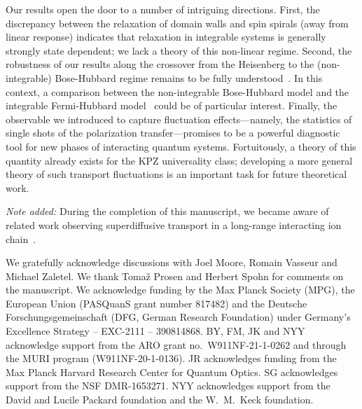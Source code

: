 \documentclass[
 reprint,
 superscriptaddress,
 amsmath,amssymb,
 aps,
 pra,
]{revtex4-2}
\begin{document}
Our results open the door to a number of intriguing directions.
%
First, the discrepancy between the relaxation of domain walls and spin spirals (away from linear response) indicates that relaxation in integrable systems is generally strongly state dependent;
we lack a theory of this non-linear regime.
%
Second, the robustness of our results along the crossover from the Heisenberg to the (non-integrable) Bose-Hubbard regime remains to be fully understood~\cite{DeNardis2021}.
%
In this context, a comparison between the non-integrable Bose-Hubbard model and the integrable Fermi-Hubbard model~\cite{Fava2020} could be of particular interest.
%
Finally, the observable we introduced to capture fluctuation effects---namely, the statistics of single shots of the polarization transfer---promises to be a powerful diagnostic tool for new phases of interacting quantum systems.
%
Fortuitously, a theory of this quantity already exists for the KPZ universality class;
developing a more general theory of such transport fluctuations is an important task for future theoretical work.

\textit{Note added:} During the completion of this manuscript, we became aware of related work observing superdiffusive transport in a long-range interacting ion chain~\cite{IonPaper}.




\begin{acknowledgments}
    

    We gratefully acknowledge discussions with Joel Moore, Romain Vasseur and Michael Zaletel.
    We thank Toma{\v z} Prosen and Herbert Spohn for comments on the manuscript.
    We acknowledge funding by the Max Planck Society (MPG), the European Union (PASQuanS grant number 817482) and the Deutsche Forschungsgemeinschaft (DFG, German Research Foundation) under Germany’s Excellence Strategy – EXC-2111 – 390814868.
    BY, FM, JK and NYY acknowledge support from the ARO grant no.~W911NF-21-1-0262 and through the MURI program (W911NF-20-1-0136).
    JR acknowledges funding from the Max Planck Harvard Research Center for Quantum Optics.
    SG acknowledges support from the NSF DMR-1653271.
    NYY acknowledges support from the David and Lucile Packard foundation and the W.~M.~Keck foundation.

\end{acknowledgments}
\end{document}
